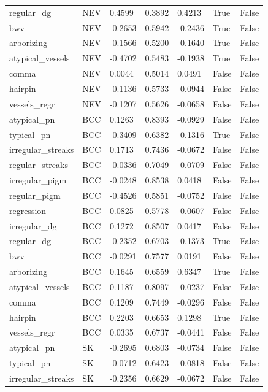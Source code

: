\begin{tabular}{lllllll}
regular\_dg & NEV & 0.4599 & 0.3892 & 0.4213 & True & False \\
bwv & NEV & -0.2653 & 0.5942 & -0.2436 & True & False \\
arborizing & NEV & -0.1566 & 0.5200 & -0.1640 & True & False \\
atypical\_vessels & NEV & -0.4702 & 0.5483 & -0.1938 & True & False \\
comma & NEV & 0.0044 & 0.5014 & 0.0491 & False & False \\
hairpin & NEV & -0.1136 & 0.5733 & -0.0944 & False & False \\
vessels\_regr & NEV & -0.1207 & 0.5626 & -0.0658 & False & False \\
atypical\_pn & BCC & 0.1263 & 0.8393 & -0.0929 & False & False \\
typical\_pn & BCC & -0.3409 & 0.6382 & -0.1316 & True & False \\
irregular\_streaks & BCC & 0.1713 & 0.7436 & -0.0672 & False & False \\
regular\_streaks & BCC & -0.0336 & 0.7049 & -0.0709 & False & False \\
irregular\_pigm & BCC & -0.0248 & 0.8538 & 0.0418 & False & False \\
regular\_pigm & BCC & -0.4526 & 0.5851 & -0.0752 & False & False \\
regression & BCC & 0.0825 & 0.5778 & -0.0607 & False & False \\
irregular\_dg & BCC & 0.1272 & 0.8507 & 0.0417 & False & False \\
regular\_dg & BCC & -0.2352 & 0.6703 & -0.1373 & True & False \\
bwv & BCC & -0.0291 & 0.7577 & 0.0191 & False & False \\
arborizing & BCC & 0.1645 & 0.6559 & 0.6347 & True & False \\
atypical\_vessels & BCC & 0.1187 & 0.8097 & -0.0237 & False & False \\
comma & BCC & 0.1209 & 0.7449 & -0.0296 & False & False \\
hairpin & BCC & 0.2203 & 0.6653 & 0.1298 & True & False \\
vessels\_regr & BCC & 0.0335 & 0.6737 & -0.0441 & False & False \\
atypical\_pn & SK & -0.2695 & 0.6803 & -0.0734 & False & False \\
typical\_pn & SK & -0.0712 & 0.6423 & -0.0818 & False & False \\
irregular\_streaks & SK & -0.2356 & 0.6629 & -0.0672 & False & False \\

\end{tabular}
